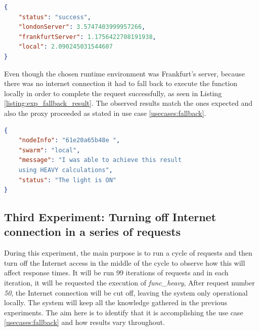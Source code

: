 \documentclass[conference]{IEEEtran}
\begin{document}
\begin{listing}
\begin{lstlisting}[language=json, basicstyle=\footnotesize]
{
    "status": "success",
    "londonServer": 3.5747403999957266,
    "frankfurtServer": 1.1756422708191938,
    "local": 2.090245031544607
}

\end{lstlisting}
\caption{}
\label{listing:exp_weight_query}
\end{listing}

Even though the chosen runtime environment was Frankfurt's server, because there
was no internet connection it had to fall back to execute the function locally in
order to complete the request successfully, as seen in Listing
\ref{listing:exp_fallback_result}. The observed results match the ones expected
and also the proxy proceeded as stated in use case \ref{usecases:fallback}.

\begin{listing}
\begin{lstlisting}[language=json, basicstyle=\footnotesize]
{
    "nodeInfo": "61e20a65b48e ",
    "swarm": "local",
    "message": "I was able to achieve this result 
    using HEAVY calculations",
    "status": "The light is ON"
}
\end{lstlisting}
\caption{The request was executed locally, as indicated by the key \textit{swarm},
which is the swarm (runtime environment) where the function was executed.
\textit{local}, is the name given to the local network of devices, as configured
when setting up the proxy.}
\label{listing:exp_fallback_result}
\end{listing}


\subsection{Third Experiment: Turning off Internet connection in a series of requests}
During this experiment, the main purpose is to run a cycle of requests and then
turn off the Internet access in the middle of the cycle to observe how this will
affect response times. It will be run 99 iterations of requests and in each
iteration, it will be requested the execution of \textit{func\_heavy}, After
request number \textit{50}, the Internet connection will be cut off, leaving the
system only operational locally. The system will keep all the knowledge gathered
in the previous experiments. The aim here is to identify that it is accomplishing
the use case \ref{usecases:fallback} and how results vary throughout.
\end{document}
